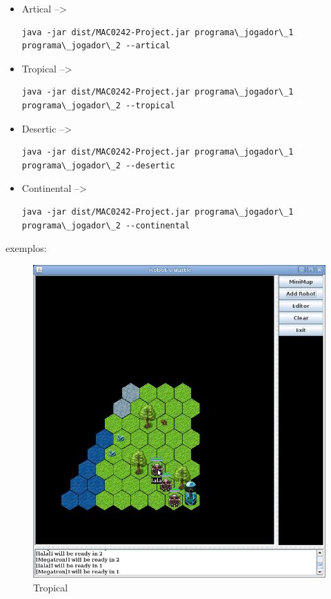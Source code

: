 \documentclass[a4paper]{article}
\begin{document}
{{{{\begin{itemize}

	\item Artical --> \begin{verbatim}java -jar dist/MAC0242-Project.jar programa\_jogador\_1 programa\_jogador\_2 --artical\end{verbatim}

	\item Tropical --> \begin{verbatim}java -jar dist/MAC0242-Project.jar programa\_jogador\_1 programa\_jogador\_2 --tropical\end{verbatim}

	\item Desertic --> \begin{verbatim}java -jar dist/MAC0242-Project.jar programa\_jogador\_1 programa\_jogador\_2 --desertic\end{verbatim}

	\item Continental --> \begin{verbatim}java -jar dist/MAC0242-Project.jar programa\_jogador\_1 programa\_jogador\_2 --continental\end{verbatim}



\end{itemize}

\bigskip
\bigskip


{\textcolor{NavyBlue}{\LARGE exemplos:}

\bigskip

\begin{figure}[h]
	\centering
    \includegraphics[scale=0.3]{TROPICAL.png}
    \caption{Tropical}
\end{figure}

}}}}}
\end{document}
